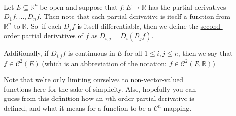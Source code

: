 \documentclass{book}
\newcommand{\myComment}{%
   \color{RawerSienna}%
   \fontsize{12}{14}\selectfont%
}
\newcommand{\teachComment}{
   \color{Orange}%
   \fontsize{12}{14}\selectfont%
}
\newenvironment{myIndent}{%
   \begin{adjustwidth}{2.5em}{0em}%
}{%
   \end{adjustwidth}%
}
\newenvironment{myTindent}{%
   \begin{adjustwidth}{7.5em}{0em}%
}{%
   \end{adjustwidth}%
}
\newcommand{\udefine}[1]{{%
   \setulcolor{Red}%
   \setul{0.14em}{0.07em}%
   \ul{#1}%
}}
\newcommand{\mySepTwo}[1][.]{%
   {\noindent\color{#1}{\rule{6.5in}{0.5mm}}}\\%
}
\newcommand{\retTwo}{\hfill\bigbreak}
\begin{document}
\mySepTwo

Let $E \subseteq \mathbb{R}^n$ be open and suppose that $f: E \longrightarrow \mathbb{R}$ has the partial derivatives\\ $D_1f, \ldots, D_nf$. Then note that each partial derivative is itself a function from\\ $\mathbb{R}^n$ to $\mathbb{R}$. So, if each $D_jf$ is itself differentiable, then we define the \udefine{second-\\order partial derivatives} of $f$ as $D_{i,j} = D_i(D_jf)$.\retTwo

Additionally, if $D_{i,j}f$ is continuous in $E$ for all $1 \leq i,j \leq n$, then we say that\\ $f \in \mathscr{C}^2(E)$ {\myComment(which is an abbreviation of the notation: $f \in \mathscr{C}^2(E, \mathbb{R})$)}.\retTwo

{\begin{myTindent}\begin{myIndent}\teachComment
   Note that we're only limiting ourselves to non-vector-valued\\ functions here for the sake of simplicity. Also, hopefully you can\\ guess from this definition how an $n$th-order partial derivative is\\ defined, and what it means for a function to be a $\mathscr{C}^n$-mapping.
\end{myIndent}\end{myTindent}}

\newpage
\end{document}
